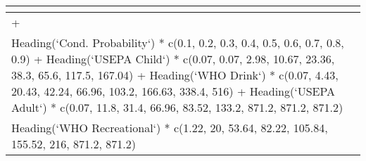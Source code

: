 \begin{table}[!tbp]
\begin{center}
\begin{tabular}{l}
\hline\hline
\multicolumn{1}{c}{}\tabularnewline
\hline
+\tabularnewline
Heading(`Cond. Probability`) * c(0.1, 0.2, 0.3, 0.4, 0.5, 0.6, 0.7, 0.8, 0.9) + Heading(`USEPA Child`) * c(0.07, 0.07, 2.98, 10.67, 23.36, 38.3, 65.6, 117.5, 167.04) + Heading(`WHO Drink`) * c(0.07, 4.43, 20.43, 42.24, 66.96, 103.2, 166.63, 338.4, 516) + Heading(`USEPA Adult`) * c(0.07, 11.8, 31.4, 66.96, 83.52, 133.2, 871.2, 871.2, 871.2)\tabularnewline
Heading(`WHO Recreational`) * c(1.22, 20, 53.64, 82.22, 105.84, 155.52, 216, 871.2, 871.2)\tabularnewline
\hline
\end{tabular}\end{center}

\end{table}
